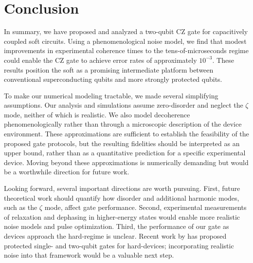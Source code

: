 \section{Conclusion}\label{zp:sec:conc}

In summary, we have proposed and analyzed a two-qubit CZ gate for capacitively coupled soft \zps circuits.
Using a phenomenological noise model, we find that modest improvements in experimental coherence times to the tens-of-microseconds regime could enable the CZ gate to achieve error rates of approximately $10^{-3}$.
These results position the soft \zps as a promising intermediate platform between conventional superconducting qubits and more strongly protected qubits.

To make our numerical modeling tractable, we made several simplifying assumptions.
Our analysis and simulations assume zero-disorder and neglect the $\zeta$ mode, neither of which is realistic.
We also model decoherence phenomenologically rather than through a microscopic description of the device environment.
These approximations are sufficient to establish the feasibility of the proposed gate protocols, but the resulting fidelities should be interpreted as an upper bound, rather than as a quantitative prediction for a specific experimental device.
Moving beyond these approximations is numerically demanding but would be a worthwhile direction for future work.

Looking forward, several important directions are worth pursuing.
First, future theoretical work should quantify how disorder and additional harmonic modes, such as the $\zeta$ mode, affect gate performance.
Second, experimental measurements of relaxation and dephasing in higher-energy \zps states would enable more realistic noise models and pulse optimization.
Third, the performance of our gate as devices approach the hard-\zps regime is unclear.
Recent work by \citet{kolesnikowProtectedPhaseGate2026} has proposed protected single- and two-qubit gates for hard-\zps devices; incorporating realistic noise into that framework would be a  valuable next step.
